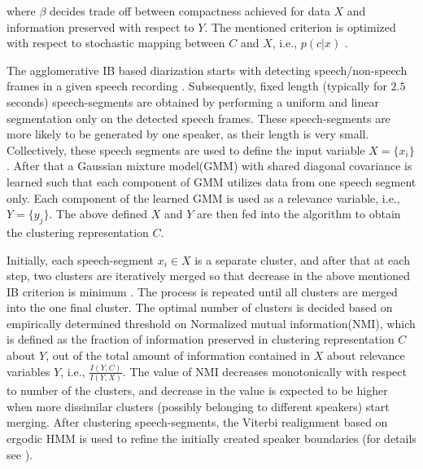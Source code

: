 \documentclass[conference]{IEEEtran}
\begin{document}
where $\beta$ decides trade off between compactness achieved for data $X$ and
information preserved with respect to $Y$. The mentioned criterion is optimized
with respect to stochastic mapping between $C$ and $X$, i.e., $p(c|x)$ . 

The agglomerative IB based diarization starts with detecting speech/non-speech
frames in a given speech recording \cite{aIB2}. Subsequently, fixed length
(typically for $2.5$ seconds) speech-segments are obtained by performing a
uniform and linear segmentation only on the detected speech frames. These
speech-segments are more likely to be generated by one speaker, as their length
is very small. Collectively, these speech segments are used to define the input
variable $X={\{x_i\}}$. After that a Gaussian mixture model(GMM) with shared
diagonal covariance is learned such that each component of GMM utilizes data
from one speech segment only. Each component of the learned GMM is used as a
relevance variable, i.e., $Y = \{ y_{j}\}$. The above defined $X$ and $Y$ are
then fed into the algorithm to obtain the clustering representation $C$. 

Initially, each speech-segment $x_i \in X$ is a separate cluster, and after that
at each step, two clusters are iteratively merged so that decrease in the above
mentioned IB criterion is minimum \cite{aIB2}. The process is repeated until all
clusters are merged into the one final cluster. The optimal number of clusters
is decided based on empirically determined threshold on Normalized mutual
information(NMI), which is defined as the fraction of information preserved in
clustering representation $C$ about $Y$, out of the total amount of information
contained in $X$ about relevance variables $Y$, i.e., $\frac{I(Y,C)}{I(Y,X)}$.
The value of NMI decreases monotonically with respect to number of the clusters,
and decrease in the value is expected to be higher when more dissimilar clusters
(possibly belonging to different speakers) start merging.  After clustering
speech-segments, the Viterbi realignment based on ergodic HMM is used to refine
the initially created speaker boundaries (for details see \cite{aIB2}).
\end{document}
